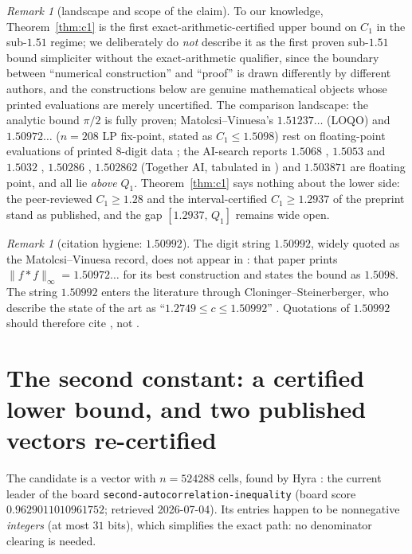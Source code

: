 \documentclass[11pt]{article}
\theoremstyle{remark}
\newtheorem{remark}[theorem]{Remark}
\newcommand{\supnorm}[1]{\lVert #1 \rVert_\infty}
\begin{document}
\begin{remark}[landscape and scope of the claim]\label{rem:c1landscape}
To our knowledge, Theorem~\ref{thm:c1} is the first
exact-arithmetic-certified upper bound on $C_1$ in the sub-$1.51$ regime; we
deliberately do \emph{not} describe it as the first proven sub-$1.51$ bound
simpliciter without the exact-arithmetic qualifier, since the boundary
between ``numerical construction'' and ``proof'' is drawn differently by
different authors, and the constructions below are genuine mathematical
objects whose printed evaluations are merely uncertified. The comparison
landscape: the analytic bound $\pi/2$ \cite{SS02} is fully proven;
Matolcsi--Vinuesa's $1.51237\ldots$ (LOQO) and $1.50972\ldots$
($n = 208$ LP fix-point, stated as $C_1 \le 1.5098$) rest on
floating-point evaluations of printed 8-digit data \cite{MV10}; the AI-search
reports $1.5068$ \cite{ThetaEvolve25}, $1.5053$ and $1.5032$
\cite{AlphaEvolve25,MathScale25}, $1.50286$ \cite{TTT26}, $1.502862$
(Together AI, tabulated in \cite{SimpleTES26}) and $1.503871$
\cite{SimpleTES26} are floating point, and all lie \emph{above}
$Q_1$. Theorem~\ref{thm:c1} says nothing about the lower side: the
peer-reviewed $C_1 \ge 1.28$ \cite{CS17} and the interval-certified
$C_1 \ge 1.2937$ of the preprint \cite{KP26} stand as published, and the gap
$[1.2937,\, Q_1]$ remains wide open.
\end{remark}

\begin{remark}[citation hygiene: $1.50992$]\label{rem:hygiene}
The digit string $1.50992$, widely quoted as the Matolcsi--Vinuesa record,
does not appear in \cite{MV10}: that paper prints
$\supnorm{f*f} = 1.50972\ldots$ for its best construction and states the
bound as $1.5098$. The string $1.50992$ enters the literature through
Cloninger--Steinerberger, who describe the state of the art as
``$1.2749 \le c \le 1.50992$'' \cite[p.~2]{CS17}. Quotations of $1.50992$
should therefore cite \cite{CS17}, not \cite{MV10}.
\end{remark}

\section{The second constant: a certified lower bound, and two published
vectors re-certified}\label{sec:c2}

The candidate is a vector with $n = 524288$ cells, found by Hyra
\cite{Hyra26}: the current leader of the board
\texttt{second-autocorrelation-inequality} (board score
$0.9629011010961752$; retrieved 2026-07-04). Its entries happen to be
nonnegative \emph{integers} (at most $31$ bits), which simplifies the exact
path: no denominator clearing is needed.
\end{document}
